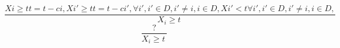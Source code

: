 $$\frac{   Xi≥t t=t-ci,   Xi'≥t t=t-ci',∀i',i'∈D,i'≠i,i∈D,   Xi'<t ∀i',i'∈D,i'≠i,i∈D,}{X_{i} \geq t~}$$ $$\frac{? }{X_{i} \geq t~}$$ 